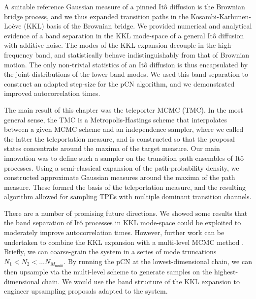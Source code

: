 \documentclass[]{cam-thesis}
\begin{document}
A suitable reference Gaussian measure of a pinned It\^{o} diffusion is the Brownian bridge process, and we thus expanded transition paths in the Kosambi-Karhunen-Lo\`eve (KKL) basis of the Brownian bridge. We provided numerical and analytical evidence of a band separation in the KKL mode-space of a general It\^{o} diffusion with additive noise. The modes of the KKL expansion decouple in the high-frequency band, and statistically behave indistinguishably from that of Brownian motion. The only non-trivial statistics of an It\^{o} diffusion is thus encapsulated by the joint distributions of the lower-band modes. We used this band separation to construct an adapted step-size for the pCN algorithm, and we demonstrated improved autocorrelation times.

The main result of this chapter was the teleporter MCMC (TMC). In the most general sense, the TMC is a Metropolis-Hastings scheme that interpolates between a given MCMC scheme and an independence sampler, where we called the latter the teleportation measure, and is constructed so that the proposal states concentrate around the maxima of the target measure. Our main innovation was to define such a sampler on the transition path ensembles of It\^{o} processes. Using a semi-classical expansion of the path-probability density, we constructed approximate Gaussian measures around the maxima of the path measure. These formed the basis of the teleportation measure, and the resulting algorithm allowed for sampling TPEs with multiple dominant transition channels.

There are a number of promising future directions. We showed some results that the band separation of It\^{o} processes in KKL mode-space could be exploited to moderately improve autocorrelation times. However, further work can be undertaken to combine the KKL expansion with a multi-level MCMC method \citep{gilesMultilevelMonteCarlo2008, dodwellHierarchicalMultilevelMarkov2015, jansenMultilevelMonteCarlo2020, rohrbachMultilevelSimulationHardsphere2022}. Briefly, we can coarse-grain the system in a series of mode truncations $N_1 < N_2 < \dots N_{M_\text{multi}}$. By running the pCN at the lowest-dimensional chain, we can then upsample via the multi-level scheme to generate samples on the highest-dimensional chain. We would use the band structure of the KKL expansion to engineer upsampling proposals adapted to the system.
\end{document}
